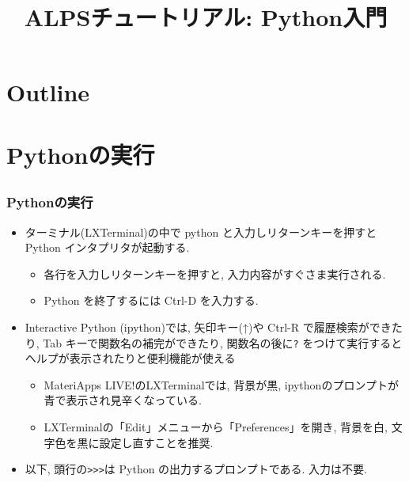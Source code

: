 
\title{ALPSチュートリアル: Python入門}



\begin{frame}
  \titlepage
\end{frame}

\section*{Outline}
\begin{frame}
  \tableofcontents
\end{frame}

\section{Pythonの実行}
\subsection*{\redm\whiteb\greenb}

\begin{frame}[t, fragile]
\frametitle{Pythonの実行}

\begin{itemize}
\item ターミナル(LXTerminal)の中で python と入力しリターンキーを押すと Python インタプリタが起動する.
  \begin{itemize}
  \item 各行を入力しリターンキーを押すと, 入力内容がすぐさま実行される.
  \item Python を終了するには Ctrl-D を入力する.
  \end{itemize}
\item Interactive Python (ipython)では, 矢印キー(↑)や Ctrl-R で履歴検索ができたり, Tab キーで関数名の補完ができたり, 関数名の後に\verb|?| をつけて実行するとヘルプが表示されたりと便利機能が使える
  \begin{itemize}
  \item MateriApps LIVE!のLXTerminalでは, 背景が黒, ipythonのプロンプトが青で表示され見辛くなっている.
  \item LXTerminalの「Edit」メニューから「Preferences」を開き, 背景を白, 文字色を黒に設定し直すことを推奨.
  \end{itemize}
\item 以下, 頭行の\verb+>>>+は Python の出力するプロンプトである. 入力は不要.
\end{itemize}
\end{frame}

